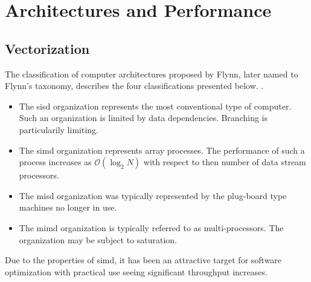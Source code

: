 

\section{Architectures and Performance}


\subsection{Vectorization}

The classification of computer architectures proposed by Flynn, later named to Flynn's taxonomy, describes the four classifications presented below. \cite{flynn1972}.

\begin{itemize}
    \item The \gls{sisd} organization represents the most conventional type of computer. Such an organization is limited by data dependencies. Branching is particularily limiting.
    \item The \gls{simd} organization represents array processes. The performance of such a process increases as $\mathcal{O}(\log_2 N)$ with respect to then number of data stream processors. 
    \item The \gls{misd} organization was typically represented by the plug-board type machines no longer in use.
    \item The \gls{mimd} organization is typically referred to as multi-processors. The organization may be subject to saturation.
\end{itemize}

Due to the properties of \gls{simd}, it has been an attractive target for software optimization with practical use seeing significant throughput increases\cite{dickson2011}.

